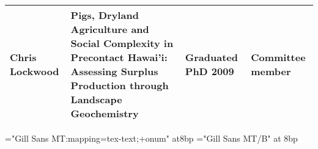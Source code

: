 \documentclass[11pt,article,oneside,oldfontcommands]{memoir}
\begin{document}
\begin{Spacing}{0.7}
\begin{center}
\begin{longtable}{ l L{6cm} p{2cm}  p{2cm} }
    Chris Lockwood          & Pigs, Dryland Agriculture and Social Complexity in Precontact Hawai'i: Assessing Surplus Production through Landscape Geochemistry                           & Graduated PhD 2009 & Committee member               \\
        \bottomrule
    \end{longtable}
\end{center}
\end{Spacing}

\smallskip 


\begin{center}

\begin{minipage*}{15cm} %

\begin{Spacing}{0.7}

\def\mainfont{Gill Sans MT}
\font\bodyfont="\mainfont:mapping=tex-text;+onum" at8bp \let\tenrm\bodyfont
\font\boldfont="\mainfont/B" at 8bp \let\tenbf\boldfont
\bodyfont



\def\arraystretch{1}%
    \begin{tabular}{ p{0.5cm} p{0.5cm} L{1.5cm} L{4cm} R{1.5cm}  R{1cm}  R{1cm}  R{1cm}  }
  

\end{tabular}
\end{Spacing}
\end{minipage*}
\end{center}
\end{document}
